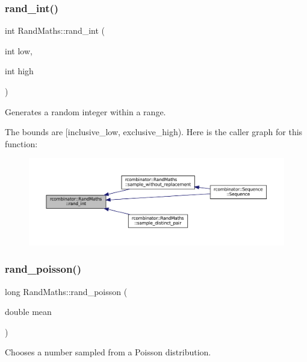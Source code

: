 \subsubsection{\texorpdfstring{rand\+\_\+int()}{rand\_int()}}
{\footnotesize\ttfamily int Rand\+Maths\+::rand\+\_\+int (\begin{DoxyParamCaption}\item[{int}]{low,  }\item[{int}]{high }\end{DoxyParamCaption})}



Generates a random integer within a range. 

The bounds are \mbox{[}inclusive\+\_\+low, exclusive\+\_\+high). Here is the caller graph for this function\+:
\nopagebreak
\begin{figure}[H]
\begin{center}
\leavevmode
\includegraphics[width=350pt]{classrcombinator_1_1RandMaths_ae417da209eb8a9d1b2217e7a5397926c_icgraph}
\end{center}
\end{figure}
\mbox{\label{classrcombinator_1_1RandMaths_a1fec117f0ebd5a7834fdcf649a23edd7}} 
\subsubsection{\texorpdfstring{rand\+\_\+poisson()}{rand\_poisson()}}
{\footnotesize\ttfamily long Rand\+Maths\+::rand\+\_\+poisson (\begin{DoxyParamCaption}\item[{double}]{mean }\end{DoxyParamCaption})}



Chooses a number sampled from a Poisson distribution. 


